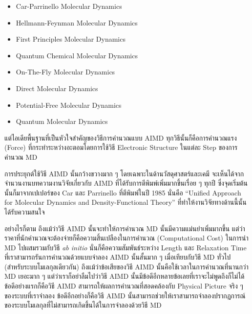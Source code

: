 \begin{itemize}[topsep=0pt,noitemsep]
  \setlength\itemsep{1em}
  \item Car-Parrinello Molecular Dynamics

  \item Hellmann-Feynman Molecular Dynamics

  \item First Principles Molecular Dynamics

  \item Quantum Chemical Molecular Dynamics

  \item On-The-Fly Molecular Dynamics

  \item Direct Molecular Dynamics

  \item Potential-Free Molecular Dynamics

  \item Quantum Molecular Dynamics
\end{itemize}

แต่ไอเดียพื้นฐานที่เป็นหัวใจสำคัญของวิธีการคำนวณแบบ AIMD ทุกวิธีนั้นก็คือการคำนวณแรง (Force) ที่กระทำระหว่างอะตอมโดยการใช้วิธี
Electronic Structure ในแต่ละ Step ของการคำนวณ MD

การประยุกต์ใช้วิธี AIMD นั้นกว้างขวางมาก ๆ โดยเฉพาะในด้านวัสดุศาสตร์และเคมี จะเห็นได้จากจำนวนงานบทความงานวิจัยเกี่ยวกับ AIMD
ที่ได้รับการตีพิมพ์เพิ่มมากขึ้นเรื่อย ๆ ทุกปี ซึ่งจุดเริ่มต้นนั้นก็มาจากเปเปอร์ของ Car และ Parrinello ที่ตีพิมพ์ในปี 1985 นั่นคือ
\enquote{Uniﬁed Approach for Molecular Dynamics and Density-Functional Theory} ที่ทำให้งานวิจัยทางด้านนี้นั้นได้รับความสนใจ

อย่างไรก็ตาม ถึงแม้ว่าวิธี AIMD นั้นจะทำให้การคำนวณ MD นั้นมีความแม่นยำเพิ่มมากขึ้น แต่ว่าราคาที่นักคำนวณจะต้องจ่ายก็คือความสิ้นเปลืองในการคำนวณ
(Computational Cost) ในการนำ MD ไปผสมรวมกับวิธี \textit{ab initio} นั่นก็คือความสัมพันธ์ระหว่าง Length และ Relaxation Time
ที่เราสามารถรันการคำนวณด้วยแบบจำลอง AIMD นั้นสั้นมาก ๆ เมื่อเทียบกับวิธี MD ทั่วไป (สำหรับระบบโมเลกุลเดียวกัน) ถึงแม้ว่าข้อเสียของวิธี AIMD
นั้นคือใช้เวลาในการคำนวณที่นานกว่า MD เยอะมาก ๆ แต่ว่าเราก็อย่าลืมไปว่าวิธี AIMD นั้นมีข้อดีอีกหลายข้อเลยที่เราจะไม่พูดถึงก็ไม่ได้
ข้อดีอย่างแรกก็คือวิธี AIMD สามารถให้ผลการคำนวณที่สอดคล้องกับ Physical Picture จริง ๆ ของระบบที่เราจำลอง ข้อดีอีกอย่างก็คือวิธี AIMD
นั้นสามารถช่วยให้เราสามารถจำลองปรากฏการณ์ของระบบโมเลกุลที่ไม่สามารถเกิดขึ้นได้ในการจำลองด้วยวิธี MD


